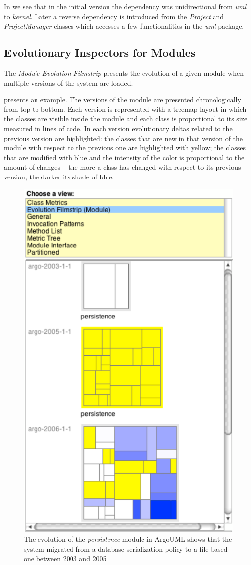 \documentclass[preprint,12pt]{elsarticle}
\newcommand{\cd}[1]{{\em{#1}}}
\begin{document}
In  we see that in the initial version the dependency was unidirectional from \cd{uml} to \cd{kernel}. Later a reverse dependency is introduced from the \cd{Project} and \cd{ProjectManager} classes which accesses a few functionalities in the \cd{uml} package.

\subsection {Evolutionary Inspectors for Modules}
The {\em Module Evolution Filmstrip} presents the evolution of a given module when multiple versions of the system are loaded. 

 presents an example. The versions of the module are presented chronologically from top to bottom. Each version is represented with a treemap layout in which the classes are visible inside the module and each class is proportional to its size measured in lines of code. In each version evolutionary deltas related to the previous version are highlighted: the classes that are new in that version of the module with respect to the previous one are highlighted with yellow; the classes that are modified with blue and the intensity of the color is proportional to the amount of changes -- the more a class has changed with respect to its previous version, the darker its shade of blue. %

\begin{figure}[h]
\begin{center}
\includegraphics[width=0.45\linewidth]{ModuleFilmstrip}
\caption{The evolution of the \cd{persistence} module in ArgoUML shows that the system migrated from a database serialization policy to a file-based one between 2003 and 2005}
\end{center}
\end{figure}
\end{document}
